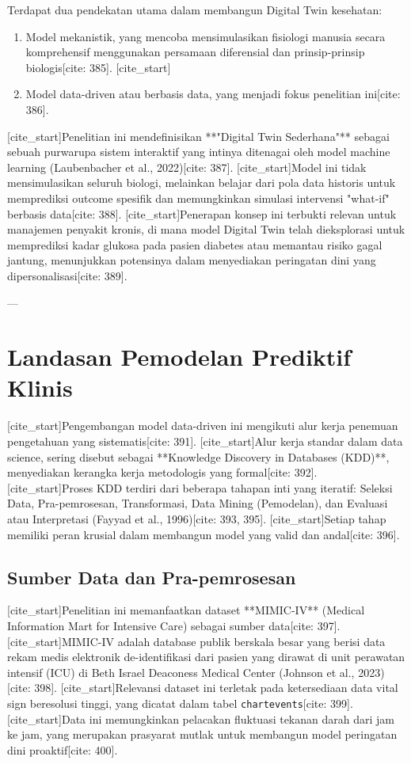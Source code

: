Terdapat dua pendekatan utama dalam membangun Digital Twin kesehatan:
\begin{enumerate}
    \item Model mekanistik, yang mencoba mensimulasikan fisiologi manusia secara komprehensif menggunakan persamaan diferensial dan prinsip-prinsip biologis[cite: 385].
    [cite_start]\item Model data-driven atau berbasis data, yang menjadi fokus penelitian ini[cite: 386].
\end{enumerate}
[cite_start]Penelitian ini mendefinisikan **"Digital Twin Sederhana"** sebagai sebuah purwarupa sistem interaktif yang intinya ditenagai oleh model machine learning (Laubenbacher et al., 2022)[cite: 387]. [cite_start]Model ini tidak mensimulasikan seluruh biologi, melainkan belajar dari pola data historis untuk memprediksi outcome spesifik dan memungkinkan simulasi intervensi "what-if" berbasis data[cite: 388]. [cite_start]Penerapan konsep ini terbukti relevan untuk manajemen penyakit kronis, di mana model Digital Twin telah dieksplorasi untuk memprediksi kadar glukosa pada pasien diabetes atau memantau risiko gagal jantung, menunjukkan potensinya dalam menyediakan peringatan dini yang dipersonalisasi[cite: 389].

---
\section{Landasan Pemodelan Prediktif Klinis}
[cite_start]Pengembangan model data-driven ini mengikuti alur kerja penemuan pengetahuan yang sistematis[cite: 391]. [cite_start]Alur kerja standar dalam data science, sering disebut sebagai **Knowledge Discovery in Databases (KDD)**, menyediakan kerangka kerja metodologis yang formal[cite: 392]. [cite_start]Proses KDD terdiri dari beberapa tahapan inti yang iteratif: Seleksi Data, Pra-pemrosesan, Transformasi, Data Mining (Pemodelan), dan Evaluasi atau Interpretasi (Fayyad et al., 1996)[cite: 393, 395]. [cite_start]Setiap tahap memiliki peran krusial dalam membangun model yang valid dan andal[cite: 396].

\subsection{Sumber Data dan Pra-pemrosesan}
[cite_start]Penelitian ini memanfaatkan dataset **MIMIC-IV** (Medical Information Mart for Intensive Care) sebagai sumber data[cite: 397]. [cite_start]MIMIC-IV adalah database publik berskala besar yang berisi data rekam medis elektronik de-identifikasi dari pasien yang dirawat di unit perawatan intensif (ICU) di Beth Israel Deaconess Medical Center (Johnson et al., 2023)[cite: 398]. [cite_start]Relevansi dataset ini terletak pada ketersediaan data vital sign beresolusi tinggi, yang dicatat dalam tabel \texttt{chartevents}[cite: 399]. [cite_start]Data ini memungkinkan pelacakan fluktuasi tekanan darah dari jam ke jam, yang merupakan prasyarat mutlak untuk membangun model peringatan dini proaktif[cite: 400].

